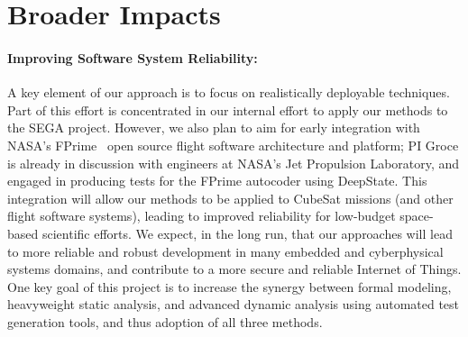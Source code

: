 \section{Broader Impacts}

\paragraph{Improving Software System Reliability:} A key element of
our approach is to focus on realistically deployable techniques.  Part
of this effort is concentrated in our internal effort to apply our
methods to the SEGA project.  However, we also plan
to aim for early integration with NASA's FPrime~\cite{fprime,fprimerepo}
open source
flight software architecture and platform; PI Groce is already in
discussion with engineers at NASA's Jet Propulsion Laboratory, and
engaged in producing tests for the FPrime autocoder using DeepState.
This integration will allow our
methods to be applied to CubeSat missions (and other flight software
systems), leading to improved reliability for low-budget space-based
scientific efforts.  We expect, in the long run, that our approaches
will lead to more reliable and robust development in many embedded and
cyberphysical systems domains, and contribute to a more secure and
reliable Internet of Things.  One key goal of this project is to
increase the synergy between formal modeling, heavyweight static
analysis, and advanced dynamic analysis using automated test
generation tools, and thus adoption of all three methods.


